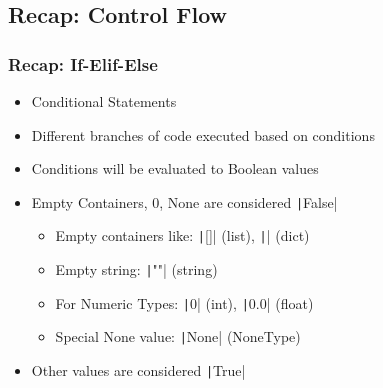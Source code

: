 \documentclass{beamer}
\newcommand{\python}[1]{\texttt|#1|}
\begin{document}
\subsection{Recap: Control Flow}
\begin{frame}[fragile]
    \frametitle{Recap: If-Elif-Else}
    \begin{itemize}
        \item Conditional Statements
        \item Different branches of code executed based on conditions
        \item Conditions will be evaluated to Boolean values
        \item Empty Containers, 0, None are considered \python{False}
              \begin{itemize}
                  \item Empty containers like: \python{[]} (list), \python{{}} (dict)
                  \item Empty string: \python{""} (string)
                  \item For Numeric Types: \python{0} (int), \python{0.0} (float)
                  \item Special None value: \python{None} (NoneType)
              \end{itemize}
        \item Other values are considered \python{True}
    \end{itemize}
\end{frame}
\end{document}
